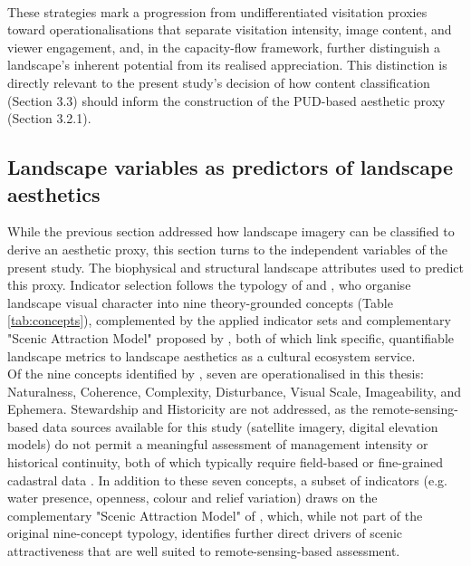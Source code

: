 \documentclass[hidelinks, 11pt]{article}
\begin{document}
\\
These strategies mark a progression from undifferentiated visitation proxies toward operationalisations that separate visitation intensity, image content, and viewer engagement, and, in the capacity-flow framework, further distinguish a landscape's inherent potential from its realised appreciation. This distinction is directly relevant to the present study's decision of how content classification (Section 3.3) should inform the construction of the PUD-based aesthetic proxy (Section 3.2.1).


\subsection{Landscape variables as predictors of landscape aesthetics}
While the previous section addressed how landscape imagery can be classified to derive an aesthetic proxy, this section turns to the independent variables of the present study. The biophysical and structural landscape attributes used to predict this proxy. Indicator selection follows the typology of \citet{tveit_key_2006} and \citet{ode_capturing_2008}, who organise landscape visual character into nine theory-grounded concepts (Table \ref{tab:concepts}), complemented by the applied indicator sets and complementary "Scenic Attraction Model" proposed by \citet{frank_landscape_2017}, both of which link specific, quantifiable landscape metrics to landscape aesthetics as a cultural ecosystem service.
\\
Of the nine concepts identified by \citet{tveit_key_2006}, seven are operationalised in this thesis: Naturalness, Coherence, Complexity, Disturbance, Visual Scale, Imageability, and Ephemera. Stewardship and Historicity are not addressed, as the remote-sensing-based data sources available for this study (satellite imagery, digital elevation models) do not permit a meaningful assessment of management intensity or historical continuity, both of which typically require field-based or fine-grained cadastral data \citep{ode_capturing_2008}. In addition to these seven concepts, a subset of indicators (e.g. water presence, openness, colour and relief variation) draws on the complementary "Scenic Attraction Model" of \citet{frank_landscape_2017}, which, while not part of the original nine-concept typology, identifies further direct drivers of scenic attractiveness that are well suited to remote-sensing-based assessment.
\\
\end{document}
